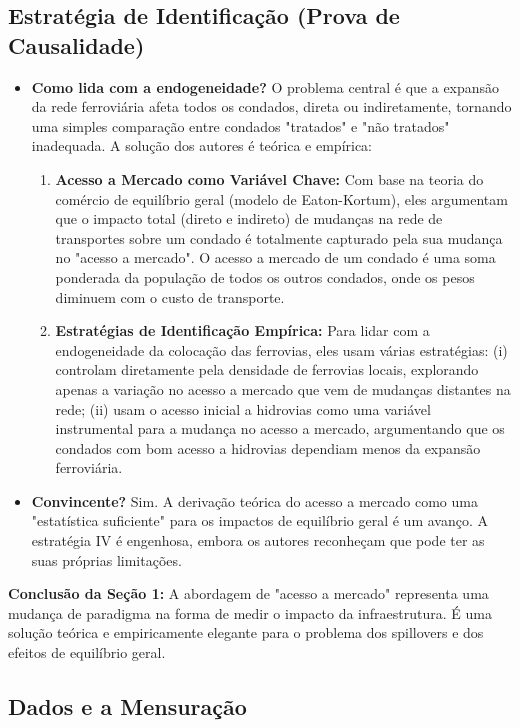 \documentclass[12pt, a4paper]{article}
\begin{document}
\subsection{Estratégia de Identificação (Prova de Causalidade)}

\begin{itemize}
    \item \textbf{Como lida com a endogeneidade?} O problema central é que a expansão da rede ferroviária afeta todos os condados, direta ou indiretamente, tornando uma simples comparação entre condados "tratados" e "não tratados" inadequada. A solução dos autores é teórica e empírica:
        \begin{enumerate}
            \item \textbf{Acesso a Mercado como Variável Chave:} Com base na teoria do comércio de equilíbrio geral (modelo de Eaton-Kortum), eles argumentam que o impacto total (direto e indireto) de mudanças na rede de transportes sobre um condado é totalmente capturado pela sua mudança no "acesso a mercado". O acesso a mercado de um condado é uma soma ponderada da população de todos os outros condados, onde os pesos diminuem com o custo de transporte.
            \item \textbf{Estratégias de Identificação Empírica:} Para lidar com a endogeneidade da colocação das ferrovias, eles usam várias estratégias: (i) controlam diretamente pela densidade de ferrovias locais, explorando apenas a variação no acesso a mercado que vem de mudanças distantes na rede; (ii) usam o acesso inicial a hidrovias como uma variável instrumental para a mudança no acesso a mercado, argumentando que os condados com bom acesso a hidrovias dependiam menos da expansão ferroviária.
        \end{enumerate}

    \item \textbf{Convincente?} Sim. A derivação teórica do acesso a mercado como uma "estatística suficiente" para os impactos de equilíbrio geral é um avanço. A estratégia IV é engenhosa, embora os autores reconheçam que pode ter as suas próprias limitações. 
\end{itemize}

\noindent\textbf{Conclusão da Seção 1:} A abordagem de "acesso a mercado" representa uma mudança de paradigma na forma de medir o impacto da infraestrutura. É uma solução teórica e empiricamente elegante para o problema dos spillovers e dos efeitos de equilíbrio geral.

\subsection{Dados e a Mensuração}
\end{document}
